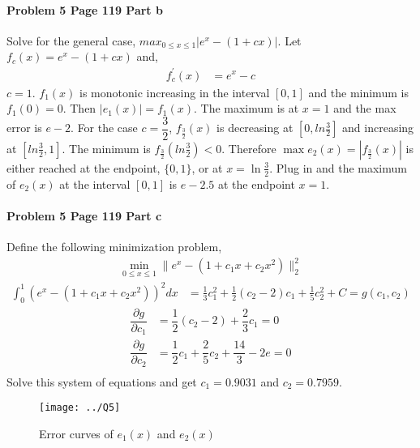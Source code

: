 \documentclass[paper=a4, fontsize=11pt]{scrartcl} %
\numberwithin{equation}{section} %
\numberwithin{figure}{section} %
\numberwithin{table}{section} %
\begin{document}
\paragraph{\textbf{Problem 5 Page 119 Part b}}  
Solve for the general case, $ max_{0 \leq x\leq 1} |e^x-(1+cx)| $. Let $  f_c(x)=e^x-(1+cx) $ and,
\begin{align*}
	f_c^\prime (x)&=e^x-c
\end{align*}
$ c=1 $. $ f_1(x) $ is monotonic increasing in the interval $ [0,1] $ and the minimum is $ f_1(0)=0$. Then $ |e_1(x)|=f_1(x) $. The maximum is at $ x=1 $ and the max error is $ e-2 $. For the case $ c=\dfrac{3}{2} $, $ f_{\frac{3}{2}}(x)$ is decreasing at $ [0,ln \frac{3}{2}] $ and increasing at $ [ln \frac{3}{2},1] $. The minimum is $ f_{\frac{3}{2}}(ln\frac{3}{2})<0 $. Therefore $ \max e_2(x)=|f_{\frac{3}{2}}(x)| $ is either reached at the endpoint, $ \{0, 1\} $, or at $ x=\ln \frac{3}{2} $. Plug in and the maximum of $ e_2(x) $ at the interval $ [0,1] $ is $ e-2.5  $ at the endpoint $ x=1 $.

\paragraph{\textbf{Problem 5 Page 119 Part c}} 
Define the following minimization problem,
\begin{align*}
	\min_{0\leq x\leq 1} \|e^x-(1+c_1x+c_2x^2) \|_2^2
\end{align*} 
\begin{align*}
	\int_{0}^{1}(e^x-(1+c_1x+c_2x^2))^2dx&=\frac{1}{3}c_1^2+\frac{1}{2}(c_2-2)c_1+\frac{1}{5}c_2^2+C=g(c_1,c_2)
\end{align*}
\begin{align*}
	\dfrac{\partial g}{\partial c_1}&=\dfrac{1}{2}(c_2-2)+\dfrac{2}{3}c_1=0\\
	\dfrac{\partial g}{\partial c_2}&=\dfrac{1}{2}c_1+\dfrac{2}{5}c_2+\dfrac{14}{3}-2e=0\\
\end{align*}
Solve this system of equations and get $ c_1=0.9031 $ and $ c_2=0.7959 $.

\begin{figure}[h]
\centering
\texttt{[image: ../Q5]}
\caption{Error curves of $ e_1(x) $ and $ e_2(x) $}
\label{fig:Q5}
\end{figure}

\newpage
\end{document}
